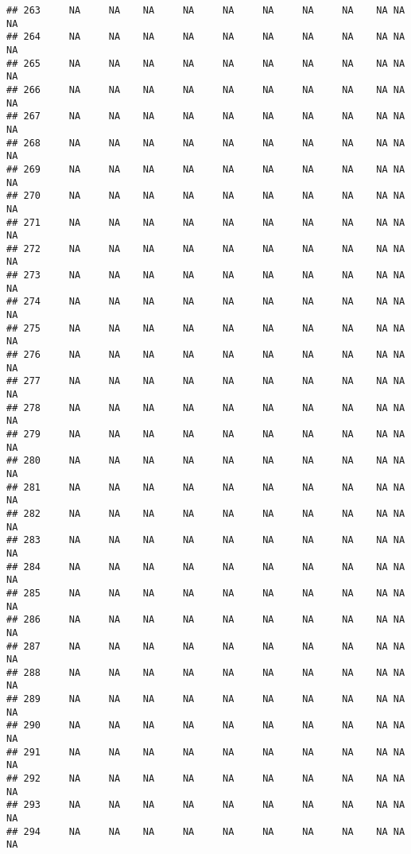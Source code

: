 \documentclass[]{article}
\begin{document}
\begin{verbatim}
## 263     NA     NA    NA     NA     NA     NA     NA     NA    NA NA          NA
## 264     NA     NA    NA     NA     NA     NA     NA     NA    NA NA          NA
## 265     NA     NA    NA     NA     NA     NA     NA     NA    NA NA          NA
## 266     NA     NA    NA     NA     NA     NA     NA     NA    NA NA          NA
## 267     NA     NA    NA     NA     NA     NA     NA     NA    NA NA          NA
## 268     NA     NA    NA     NA     NA     NA     NA     NA    NA NA          NA
## 269     NA     NA    NA     NA     NA     NA     NA     NA    NA NA          NA
## 270     NA     NA    NA     NA     NA     NA     NA     NA    NA NA          NA
## 271     NA     NA    NA     NA     NA     NA     NA     NA    NA NA          NA
## 272     NA     NA    NA     NA     NA     NA     NA     NA    NA NA          NA
## 273     NA     NA    NA     NA     NA     NA     NA     NA    NA NA          NA
## 274     NA     NA    NA     NA     NA     NA     NA     NA    NA NA          NA
## 275     NA     NA    NA     NA     NA     NA     NA     NA    NA NA          NA
## 276     NA     NA    NA     NA     NA     NA     NA     NA    NA NA          NA
## 277     NA     NA    NA     NA     NA     NA     NA     NA    NA NA          NA
## 278     NA     NA    NA     NA     NA     NA     NA     NA    NA NA          NA
## 279     NA     NA    NA     NA     NA     NA     NA     NA    NA NA          NA
## 280     NA     NA    NA     NA     NA     NA     NA     NA    NA NA          NA
## 281     NA     NA    NA     NA     NA     NA     NA     NA    NA NA          NA
## 282     NA     NA    NA     NA     NA     NA     NA     NA    NA NA          NA
## 283     NA     NA    NA     NA     NA     NA     NA     NA    NA NA          NA
## 284     NA     NA    NA     NA     NA     NA     NA     NA    NA NA          NA
## 285     NA     NA    NA     NA     NA     NA     NA     NA    NA NA          NA
## 286     NA     NA    NA     NA     NA     NA     NA     NA    NA NA          NA
## 287     NA     NA    NA     NA     NA     NA     NA     NA    NA NA          NA
## 288     NA     NA    NA     NA     NA     NA     NA     NA    NA NA          NA
## 289     NA     NA    NA     NA     NA     NA     NA     NA    NA NA          NA
## 290     NA     NA    NA     NA     NA     NA     NA     NA    NA NA          NA
## 291     NA     NA    NA     NA     NA     NA     NA     NA    NA NA          NA
## 292     NA     NA    NA     NA     NA     NA     NA     NA    NA NA          NA
## 293     NA     NA    NA     NA     NA     NA     NA     NA    NA NA          NA
## 294     NA     NA    NA     NA     NA     NA     NA     NA    NA NA          NA

\end{verbatim}
\end{document}

